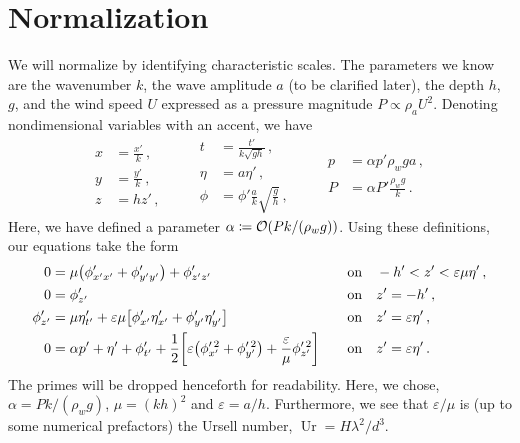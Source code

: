 \documentclass{jfm}
\DeclareMathOperator{\Ur}{Ur}
\renewcommand*{\epsilon}{\varepsilon}
\begin{document}
\section{Normalization}
We will normalize by identifying characteristic scales.
The parameters we know \apriori are the wavenumber $k$, the wave
amplitude $a$ (to be clarified later), the depth $h$, $g$, and the
wind speed $U$ expressed as a pressure magnitude $P \propto \rho_a U^2$.
Denoting nondimensional variables with an accent, we have
\begin{equation*}
  \begin{aligned}
  x &= \frac{x'}{k} \,, \\
  y &= \frac{y'}{k} \,, \\
  z &= h z' \,,
  \end{aligned}
  \qquad
  \begin{aligned}
  t &= \frac{t'}{k\sqrt{g h}} \,, \\
  \eta &= a \eta' \,, \\
  \phi &= \phi'\frac{a}{k}\sqrt{\frac{g}{h}} \,,
  \end{aligned}
  \qquad
  \begin{aligned}
  p &= \alpha p' \rho_w g a \,, \\
  P &= \alpha P' \frac{\rho_w g}{k} \,.
  \end{aligned}
\end{equation*}
Here, we have defined a parameter $\alpha \coloneqq \order{P k/(\rho_w g
)}$.
Using these definitions, our equations take the form
\begin{alignat}{2}
  0 &= \mu \pqty{\phi'_{x'x'} + \phi'_{y'y'}} + \phi'_{z'z'} &&\qq{on}
    -h' < z' < \epsilon \mu \eta' \,, \label{eq:laplace_nondim} \\
  0 &= \phi'_{z'} &&\qq{on} z'=-h' \,, \label{eq:bottom_bc_nondim} \\
  \phi'_{z'} &= \mu \eta'_{t'} +
    \epsilon \mu \bqty{\phi'_{x'} \eta'_{x'} + \phi'_{y'} \eta'_{y'}}
    &&\qq{on} z' = \epsilon \eta' \,, \label{eq:kinematic_bc_nondim} \\
  0 &= \alpha p' +  \eta' + \phi'_{t'} + \frac{1}{2}
    \bqty{\epsilon \pqty{\phi_{x'}^{\prime \, 2} + \phi_{y'}^{\prime \,
    2}} +  \frac{\epsilon}{\mu} \phi_{z'}^{\prime \, 2}} &&\qq{on} z'=
    \epsilon \eta' \,.  \label{eq:dynamic_bc_nondim}
\end{alignat}
The primes will be dropped henceforth for readability.
Here, we chose, $\alpha = P k/(\rho_w g)$, $\mu = (k h)^2$ and
$\epsilon = a / h$.
Furthermore, we see that $\epsilon/\mu$ is (up to some numerical
prefactors) the Ursell number, $\Ur = H \lambda^2/d^3$.
\end{document}
